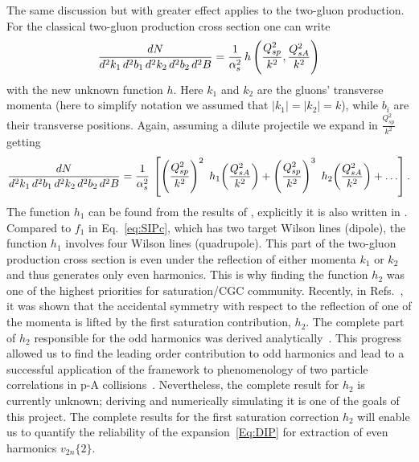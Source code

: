  
The same discussion but with greater effect applies to the two-gluon production. For the
classical two-gluon production cross section one can write
\begin{align}
	\frac{dN}{d^2 k_1 \, d^2 b_1 \, d^2 k_2 \, d^2 b_2 \, d^2 B} 
  = \frac{1}{\alpha_s^2} \, h
  \left( 
  \frac{Q_{sp}^2}{k^2},  	 
   \frac{Q_{sA}^2}{k^2}  	 
  \right)
 \end{align}
 with the new unknown function $h$. Here $k_1$ and $k_2$ are the
 gluons' transverse momenta (here to simplify notation 
 we assumed that $|k_1|=|k_2|=k$), while $b_i$ are their
 transverse positions. Again, assuming a dilute projectile we expand
 in $\frac{Q_{sp}^2}{k^2}$ getting
\begin{align}
  \frac{dN}{d^2 k_1 \, d^2 b_1 \, d^2 k_2 \, d^2 b_2 \, d^2 B} =
  \frac{1}{\as^2} \, \left[ \left( \frac{Q_{sp}^2}{k^2}  \right)^2 \ 
	  h_1
    \!\left(  \frac{Q_{sA}^2}{k^2} \right) + \left( \frac{Q_{sp}^2}{k^2}  \right)^3 \ h_2 \! \left( \frac{Q_{sA}^2}{k^2}  \right) + \ldots
  \right] .
  \label{Eq:DIP}
\end{align}
The function $h_1$ can be found from the results of
\myrefs\cite{Kovner:2012jm,Kovchegov:2012nd}, 
explicitly it is also written in \myrefs\cite{Kovner:2018fxj}. 
Compared to $f_1$ in Eq.~\eqref{eq:SIPc}, which has two target Wilson lines (dipole), 
the function $h_1$ involves four Wilson lines (quadrupole). 
This
part of the two-gluon production cross section is even 
under the reflection of either momenta $k_1$ or $k_2$ and thus 
generates  only even harmonics. This is why finding the function $h_2$ 
was one of the highest priorities for saturation/CGC community. 
Recently, in Refs.~\cite{McLerran:2016snu,Kovchegov:2018jun},
it was shown that the accidental symmetry with respect to the 
reflection of one of the momenta is lifted by the 
first saturation contribution, $h_2$. 
The complete part of $h_2$ responsible for the
odd harmonics was derived analytically~\cite{McLerran:2016snu,Kovchegov:2018jun}. 
This progress allowed us to find the leading order contribution to odd harmonics and lead to 
a  
successful application of the framework to phenomenology of two particle correlations in p-A 
collisions~\cite{Mace:2018vwq,Mace:2018yvl}.
Nevertheless, the complete result for $h_2$ is currently unknown; 
deriving and numerically simulating it is one  of the goals of this project.
The complete results for the first saturation correction $h_2$
will enable us to quantify the reliability of the expansion~\eqref{Eq:DIP}
for extraction of even harmonics  $v_{2n}\{2\}$. 


